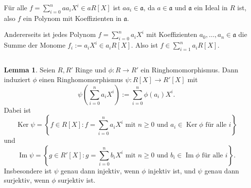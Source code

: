 \documentclass[a4paper,10pt]{article}
\theoremstyle{definition}
\newtheorem{lem}[beh]{Lemma}
\newcommand{\mf}[1]{\mathfrak{#1}}
\newcommand{\Img}{\operatorname{Im}}
\newcommand{\Ker}{\operatorname{Ker}}
\begin{document}
Für alle $f = \sum_{i=0}^n a a_i X^i \in a R[X]$ ist $a a_i \in \mf{a}$, da $a \in \mf{a}$ und $\mf{a}$ ein Ideal in $R$ ist, also $f$ ein Polynom mit Koeffizienten in $\mf{a}$.

Andererseits ist jedes Polynom $f = \sum_{i=0}^n a_i X^i$ mit Koeffizienten $a_0, \ldots, a_n \in \mf{a}$ die Summe der Monome $f_i := a_i X^i \in a_i R[X]$. Also ist $f \in \sum_{i=1}^n a_i R[X]$.


\subsection{}

\begin{lem} \label{lem: ringhomo polynom}
 Seien $R, R'$ Ringe und $\phi: R \rightarrow R'$ ein Ringhomomorphismus. Dann induziert $\phi$ einen Ringhomomorphismus $\psi: R[X] \rightarrow R'[X]$ mit
  \[
   \psi\left( \sum_{i=0}^n a_i X^i \right) := \sum_{i=0}^n \phi(a_i) X^i.
  \]
  Dabei ist
  \[
   \Ker \psi = \left\{f \in R[X] : f = \sum_{i=0}^n a_i X^i \text{ mit } n \geq 0 \text{ und } a_i \in \Ker \phi \text{ für alle }i\right\}
  \]
  und
  \[
   \Img \psi = \left\{g \in R'[X] : g = \sum_{i=0}^n b_i X^i \text{ mit } n \geq 0 \text{ und } b_i \in \Img \phi \text{ für alle }i\right\}.
  \]
  Insbesondere ist $\psi$ genau dann injektiv, wenn $\phi$ injektiv ist, und $\psi$ genau dann surjektiv, wenn $\phi$ surjektiv ist.
\end{lem}
\end{document}

